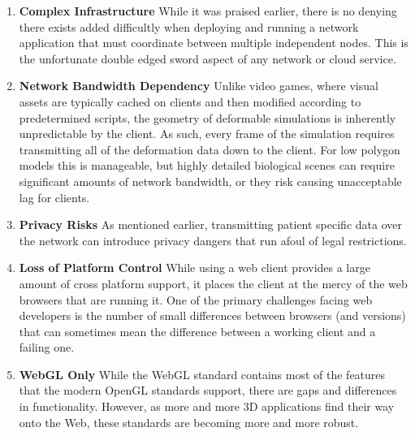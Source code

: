  \begin{enumerate}

   \item \textbf{Complex Infrastructure} While it was praised earlier,
     there is no denying there exists added difficultly when deploying
     and running a network application that must coordinate between
     multiple independent nodes. This is the unfortunate double edged
     sword aspect of any network or cloud service.

   \item \textbf{Network Bandwidth Dependency} Unlike video games,
     where visual assets are typically cached on clients and then
     modified according to predetermined scripts, the geometry of
     deformable simulations is inherently unpredictable by the
     client. As such, every frame of the simulation requires
     transmitting all of the deformation data down to the client. For
     low polygon models this is manageable, but highly detailed
     biological scenes can require significant amounts of network
     bandwidth, or they risk causing unacceptable lag for clients.

     \item \textbf{Privacy Risks} As mentioned earlier, transmitting
       patient specific data over the network can introduce privacy
       dangers that run afoul of legal restrictions.

     \item \textbf{Loss of Platform Control} While using a web client
       provides a large amount of cross platform support, it places
       the client at the mercy of the web browsers that are running
       it. One of the primary challenges facing web developers is the
       number of small differences between browsers (and versions)
       that can sometimes mean the difference between a working client
       and a failing one.

     \item \textbf{WebGL Only} While the WebGL standard contains most
       of the features that the modern OpenGL standards support, there
       are gaps and differences in functionality. However, as more and
       more 3D applications find their way onto the Web, these
       standards are becoming more and more robust.
     
 \end{enumerate}

